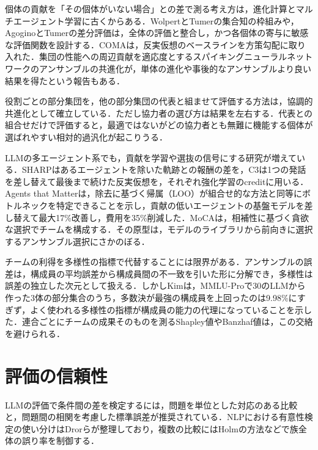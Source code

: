 個体の貢献を「その個体がいない場合」との差で測る考え方は，進化計算とマルチエージェント学習に古くからある．WolpertとTumer\cite{wolpert1999collective}の集合知の枠組みや，AgoginoとTumer\cite{agogino2008efficient}の差分評価は，全体の評価と整合し，かつ各個体の寄与に敏感な評価関数を設計する．COMA\cite{foerster2018counterfactual}は，反実仮想のベースラインを方策勾配に取り入れた．集団の性能への周辺貢献を適応度とするスパイキングニューラルネットワークのアンサンブルの共進化が，単体の進化や事後的なアンサンブルより良い結果を得たという報告もある\cite{rodriquez2026snn}．

役割ごとの部分集団を，他の部分集団の代表と組ませて評価する方法は，協調的共進化\cite{potter1994cooperative}として確立している．ただし協力者の選び方は結果を左右する\cite{wiegand2001empirical}．代表との組合せだけで評価すると，最適ではないがどの協力者とも無難に機能する個体が選ばれやすい相対的過汎化が起こりうる\cite{panait2006biasing}．

LLMの多エージェント系でも，貢献を学習や選抜の信号にする研究が増えている．SHARP\cite{li2026sharp}はあるエージェントを除いた軌跡との報酬の差を，C3\cite{chen2026trace}は1つの発話を差し替えて最後まで続けた反実仮想を，それぞれ強化学習のcreditに用いる．Agents that Matter\cite{lu2026agents}は，除去に基づく帰属（LOO）が組合せ的な方法と同等にボトルネックを特定できることを示し，貢献の低いエージェントの基盤モデルを差し替えて最大17\%改善し，費用を35\%削減した．MoCA\cite{zhang2026moca}は，相補性に基づく貪欲な選択でチームを構成する．その原型は，モデルのライブラリから前向きに選択するアンサンブル選択\cite{caruana2004ensemble}にさかのぼる．

チームの利得を多様性の指標で代替することには限界がある．アンサンブルの誤差は，構成員の平均誤差から構成員間の不一致を引いた形に分解でき\cite{krogh1995neural}，多様性は誤差の独立した次元として扱える\cite{wood2023unified}．しかしKim\cite{kim2026diversity}は，MMLU-Proで30のLLMから作った3体の部分集合のうち，多数決が最強の構成員を上回ったのは9.98\%にすぎず，よく使われる多様性の指標が構成員の能力の代理になっていることを示した．連合ごとにチームの成果そのものを測るShapley値やBanzhaf値は，この交絡を避けられる．

\section{評価の信頼性}
\label{sec:2.6}

LLMの評価で条件間の差を検定するには，問題を単位とした対応のある比較と，問題間の相関を考慮した標準誤差が推奨されている\cite{miller2024adding}．NLPにおける有意性検定の使い分けはDrorら\cite{dror2018hitchhiker}が整理しており，複数の比較にはHolmの方法\cite{holm1979simple}などで族全体の誤り率を制御する．

